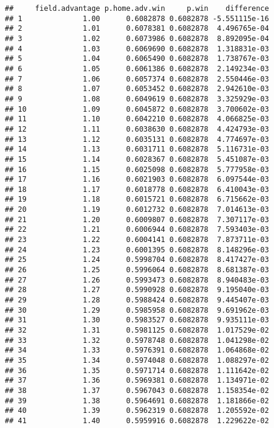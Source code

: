\documentclass[
]{article}
\begin{document}
\begin{verbatim}
##     field.advantage p.home.adv.win     p.win    difference
## 1              1.00      0.6082878 0.6082878 -5.551115e-16
## 2              1.01      0.6078381 0.6082878  4.496765e-04
## 3              1.02      0.6073986 0.6082878  8.892095e-04
## 4              1.03      0.6069690 0.6082878  1.318831e-03
## 5              1.04      0.6065490 0.6082878  1.738767e-03
## 6              1.05      0.6061386 0.6082878  2.149234e-03
## 7              1.06      0.6057374 0.6082878  2.550446e-03
## 8              1.07      0.6053452 0.6082878  2.942610e-03
## 9              1.08      0.6049619 0.6082878  3.325929e-03
## 10             1.09      0.6045872 0.6082878  3.700602e-03
## 11             1.10      0.6042210 0.6082878  4.066825e-03
## 12             1.11      0.6038630 0.6082878  4.424793e-03
## 13             1.12      0.6035131 0.6082878  4.774697e-03
## 14             1.13      0.6031711 0.6082878  5.116731e-03
## 15             1.14      0.6028367 0.6082878  5.451087e-03
## 16             1.15      0.6025098 0.6082878  5.777958e-03
## 17             1.16      0.6021903 0.6082878  6.097544e-03
## 18             1.17      0.6018778 0.6082878  6.410043e-03
## 19             1.18      0.6015721 0.6082878  6.715662e-03
## 20             1.19      0.6012732 0.6082878  7.014613e-03
## 21             1.20      0.6009807 0.6082878  7.307117e-03
## 22             1.21      0.6006944 0.6082878  7.593403e-03
## 23             1.22      0.6004141 0.6082878  7.873711e-03
## 24             1.23      0.6001395 0.6082878  8.148296e-03
## 25             1.24      0.5998704 0.6082878  8.417427e-03
## 26             1.25      0.5996064 0.6082878  8.681387e-03
## 27             1.26      0.5993473 0.6082878  8.940483e-03
## 28             1.27      0.5990928 0.6082878  9.195040e-03
## 29             1.28      0.5988424 0.6082878  9.445407e-03
## 30             1.29      0.5985958 0.6082878  9.691962e-03
## 31             1.30      0.5983527 0.6082878  9.935111e-03
## 32             1.31      0.5981125 0.6082878  1.017529e-02
## 33             1.32      0.5978748 0.6082878  1.041298e-02
## 34             1.33      0.5976391 0.6082878  1.064868e-02
## 35             1.34      0.5974048 0.6082878  1.088297e-02
## 36             1.35      0.5971714 0.6082878  1.111642e-02
## 37             1.36      0.5969381 0.6082878  1.134971e-02
## 38             1.37      0.5967043 0.6082878  1.158354e-02
## 39             1.38      0.5964691 0.6082878  1.181866e-02
## 40             1.39      0.5962319 0.6082878  1.205592e-02
## 41             1.40      0.5959916 0.6082878  1.229622e-02

\end{verbatim}
\end{document}
